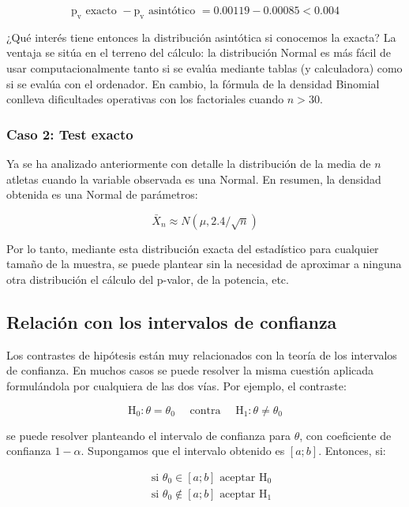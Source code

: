 \documentclass[
]{article}
\begin{document}
\[
\mathrm{p}_{\mathrm{v}}\text{ exacto }-\mathrm{p}_{\mathrm{v}}\text{ asintótico }=0.00119-0.00085<0.004
\]

¿Qué interés tiene entonces la distribución asintótica si conocemos la exacta? La ventaja se sitúa en el terreno del cálculo: la distribución Normal es más fácil de usar computacionalmente tanto si se evalúa mediante tablas (y calculadora) como si se evalúa con el ordenador. En cambio, la fórmula de la densidad Binomial conlleva dificultades operativas con los factoriales cuando \(n>30\).

\subsubsection{Caso 2: Test exacto}\label{caso-2-test-exacto}

Ya se ha analizado anteriormente con detalle la distribución de la media de \(n\) atletas cuando la variable observada es una Normal. En resumen, la densidad obtenida es una Normal de parámetros:

\[
\bar{X}_{n} \approx N(\mu, 2.4 / \sqrt{n})
\]

Por lo tanto, mediante esta distribución exacta del estadístico para cualquier tamaño de la muestra, se puede plantear sin la necesidad de aproximar a ninguna otra distribución el cálculo del p-valor, de la potencia, etc.

\subsection{Relación con los intervalos de confianza}\label{relaciuxf3n-con-los-intervalos-de-confianza}

Los contrastes de hipótesis están muy relacionados con la teoría de los intervalos de confianza. En muchos casos se puede resolver la misma cuestión aplicada formulándola por cualquiera de las dos vías. Por ejemplo, el contraste:

\[
\mathrm{H}_{0}: \theta=\theta_{0} \quad \text { contra } \quad \mathrm{H}_{1}: \theta \neq \theta_{0}
\]

se puede resolver planteando el intervalo de confianza para \(\theta\), con coeficiente de confianza \(1-\alpha\). Supongamos que el intervalo obtenido es \([a ; b]\). Entonces, si:

\[
\begin{aligned}
& \text { si } \theta_{0} \in[a ; b] \text { aceptar } \mathrm{H}_{0} \\
& \text { si } \theta_{0} \notin[a ; b] \text { aceptar } \mathrm{H}_{1}
\end{aligned}
\]
\end{document}
